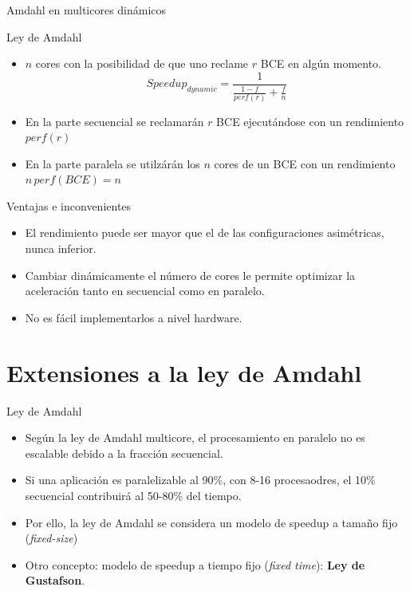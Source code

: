 \documentclass[utf8]{beamer}
\begin{document}
\begin{frame}[allowframebreaks]{Amdahl en multicores dinámicos}
    \begin{block}{Ley de Amdahl}
        \begin{itemize}
            \item $n$ cores con la posibilidad de que uno reclame $r$ BCE en algún momento.
            $$ Speedup_{dynamic} = \frac{1}{\frac{1 - f}{perf(r)} + \frac{f}{n}} $$
            \item En la parte secuencial se reclamarán $r$ BCE ejecutándose con un rendimiento $perf(r)$
            \item En la parte paralela se utilzárán los $n$ cores de un BCE con un rendimiento $n\,perf(BCE) = n$
        \end{itemize}
    \end{block}
    \begin{block}{Ventajas e inconvenientes}
        \begin{itemize}
            \item El rendimiento puede ser mayor que el de las configuraciones asimétricas, nunca inferior.
            \item Cambiar dinámicamente el número de cores le permite optimizar la aceleración tanto en secuencial como en paralelo. 
            \item No es fácil implementarlos a nivel hardware.
        \end{itemize}
    \end{block}
\end{frame}

\section{Extensiones a la ley de Amdahl}


\begin{frame}{Ley de Amdahl}
    \begin{block}{}
    \begin{itemize}
        \item Según la ley de Amdahl multicore, el procesamiento en paralelo no es escalable debido a la fracción secuencial.
        \item Si una aplicación es paralelizable al 90\%, con 8-16 procesaodres, el 10\% secuencial contribuirá al 50-80\% del tiempo.
        \item Por ello, la ley de Amdahl se considera un modelo de speedup a tamaño fijo (\emph{fixed-size})
        \item Otro concepto: modelo de speedup a tiempo fijo (\emph{fixed time}): \textbf{Ley de Gustafson}.
    \end{itemize}
    \end{block}
\end{frame}
\end{document}
